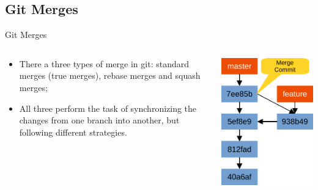 \documentclass{beamer}
\begin{document}
\subsection{Git Merges}
\begin{frame}{Git Merges}
  \begin{columns}
    \begin{column}{0.6\textwidth}
      \begin{itemize}
        \item There a three types of merge in git: standard merges (true merges), rebase merges and squash merges;
        \item All three perform the task of synchronizing the changes from one branch into another, but following different strategies.
      \end{itemize}
    \end{column}
    \begin{column}{0.4\textwidth}
      \begin{center}
        \includegraphics[scale=0.5]{git-merge}
      \end{center}
    \end{column}
  \end{columns}
\end{frame}
\end{document}
